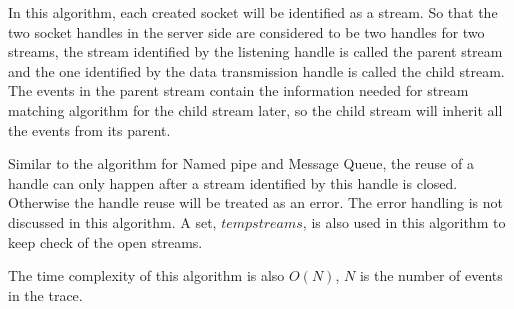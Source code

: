 In this algorithm, each created socket will be identified as a stream. So that the two socket handles in the server side are considered to be two handles for two streams, the stream identified by the listening handle is called the parent stream and the one identified by the data transmission handle is called the child stream. The events in the parent stream contain the information needed for stream matching algorithm for the child stream later, so the child stream will inherit all the events from its parent. 

Similar to the algorithm for Named pipe and Message Queue, the reuse of a handle can only happen after a stream identified by this handle is closed. Otherwise the handle reuse will be treated as an error. The error handling is not discussed in this algorithm. A set, $tempstreams$, is also used in this algorithm to keep check of the open streams.

The time complexity of this algorithm is also $O(N)$, $N$ is the number of events in the trace.


